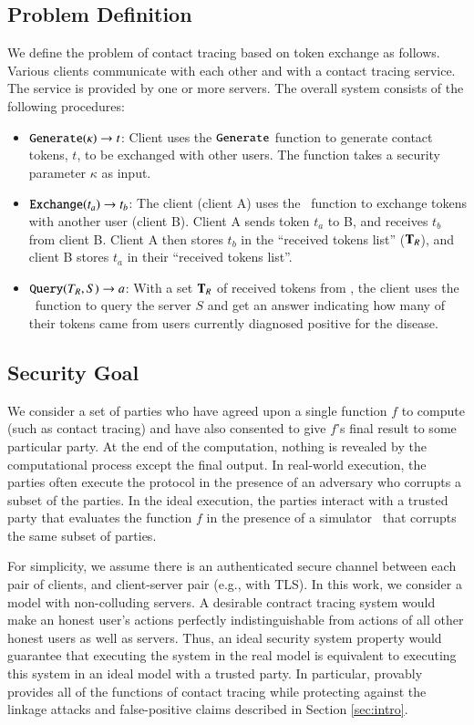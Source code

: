 \subsection{Problem Definition}
\label{subs:probl}
We define the problem of contact tracing based on token exchange as follows. Various clients communicate with each other and with a contact tracing service. The service is provided by one or more servers. The overall system consists of the following procedures:
\begin{itemize} 
	\item $\texttt{Generate}(\kappa) \rightarrow t$: Client uses the $\texttt{Generate}$ function to generate contact tokens, $t$, to be exchanged with other users.  The function takes a security parameter $\kappa$ as input.
	
	\item $\texttt{Exchange}(t_a) \rightarrow t_b$: The client (client A) uses the \ctexchange\ function to exchange tokens with another user (client B). Client A sends token $t_a$ to B, and receives $t_b$ from client B. Client A then stores $t_b$ in the ``received tokens list'' ($\mathbf{T}_R$), and client B stores $t_a$ in their ``received tokens list''.
	
	\item $\texttt{Query}(T_R, S) \rightarrow a$: With a set $\mathbf{T}_R$ of received tokens from \ctexchange, the client uses the \ctquery\ function to query the server $S$ and get an answer indicating how many of their tokens came from users currently diagnosed positive for the disease.
	
\end{itemize}

\subsection{Security Goal} 
\label{subs:secure_def}
We consider a set of parties who have agreed upon a single function $f$ to compute (such as contact tracing) and have also consented to give $f$'s final result to some particular party. At the end of the computation, nothing is revealed by the computational process except the final output. In real-world execution, the parties often execute the protocol in the presence of an adversary \adv who corrupts a subset of the parties. In the ideal execution, the parties interact with a trusted party that evaluates the function $f$ in the presence of a simulator \Sim ~that corrupts the same subset of parties. 
 
For simplicity, we assume there is an authenticated secure channel between each pair of clients, and client-server pair (e.g., with TLS).  In this work, we consider a model with non-colluding servers. A desirable contract tracing system would make an honest user's actions perfectly indistinguishable from actions of all other honest users as well as servers. Thus, an ideal security system property would guarantee that executing the system in the real model is equivalent to executing this system in an ideal model with a trusted party. In particular, \dect provably provides all of the functions of contact tracing while protecting against the linkage attacks and false-positive claims described in Section \ref{sec:intro}.

